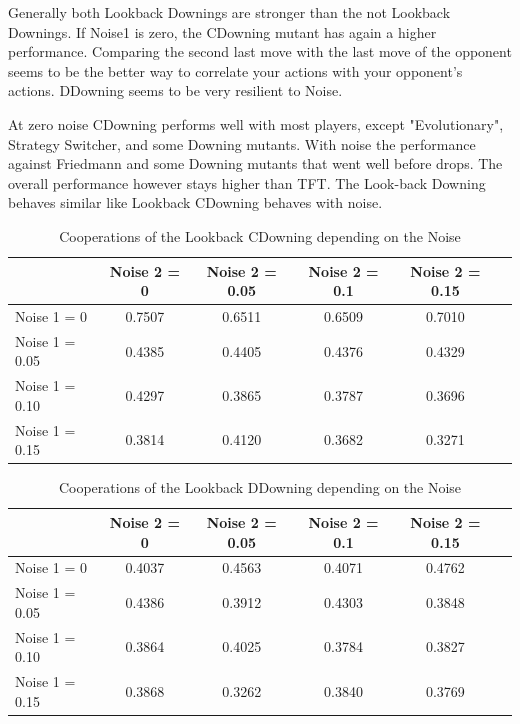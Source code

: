 \documentclass[11pt,twoside]{article}
\begin{document}
Generally both Lookback Downings are stronger than the not Lookback Downings. If Noise1 is zero, the CDowning mutant has again a higher performance. Comparing the second last move with the last move of the opponent seems to be the better way to correlate your actions with your opponent's actions. DDowning seems to be very resilient to Noise.

At zero noise CDowning performs well with most players, except "Evolutionary", Strategy Switcher, and some Downing mutants. With noise the performance against Friedmann and some Downing mutants that went well before drops. The overall performance however stays higher than TFT. The Look-back Downing behaves similar like Lookback CDowning behaves with noise.

\begin{table}[h]
 \begin{center}
\caption{Cooperations of the Lookback CDowning depending on the Noise} \vspace{3mm}
\begin{tabular}{|l|c|c|c|c|c|}
\hline
   	& Noise 2 = 0 & Noise 2 = 0.05& Noise 2 = 0.1& Noise 2 = 0.15 \\
  \hline
  Noise 1 = 0 	&     0.7507   & 0.6511 &   0.6509&    0.7010 \\
 \hline
  Noise 1 = 0.05	 &      0.4385 &   0.4405 &   0.4376 &   0.4329 \\
 \hline
  Noise 1 = 0.10 	&      0.4297  &  0.3865  &  0.3787  &  0.3696 \\
 \hline
  Noise 1 = 0.15 	&    0.3814  &  0.4120 &   0.3682  &  0.3271 \\
 \hline
\end{tabular}
 \end{center}
\end{table}

\begin{table}[h]
 \begin{center}
\caption{Cooperations of the Lookback DDowning depending on the Noise} \vspace{3mm}
\begin{tabular}{|l|c|c|c|c|c|}
\hline
   	& Noise 2 = 0 & Noise 2 = 0.05& Noise 2 = 0.1& Noise 2 = 0.15 \\
  \hline
  Noise 1 = 0 	&   0.4037 &   0.4563 &   0.4071   & 0.4762 \\
 \hline
  Noise 1 = 0.05	 &     0.4386  &  0.3912 &   0.4303   & 0.3848 \\
 \hline
  Noise 1 = 0.10 	&      0.3864   & 0.4025  &  0.3784 &  0.3827 \\
 \hline
  Noise 1 = 0.15 	&    0.3868 &   0.3262 &   0.3840  &  0.3769 \\
 \hline
\end{tabular}
 \end{center}
\end{table}
\end{document}
